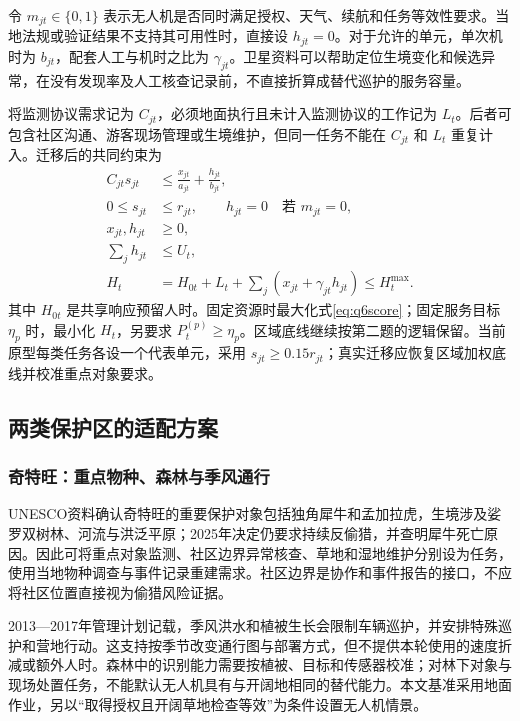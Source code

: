 \documentclass[UTF8,fontset=fandol,12pt,a4paper]{ctexart}
\begin{document}
令 \(m_{jt}\in\{0,1\}\) 表示无人机是否同时满足授权、天气、续航和任务等效性要求。当地法规或验证结果不支持其可用性时，直接设 \(h_{jt}=0\)。对于允许的单元，单次机时为 \(b_{jt}\)，配套人工与机时之比为 \(\gamma_{jt}\)。卫星资料可以帮助定位生境变化和候选异常，在没有发现率及人工核查记录前，不直接折算成替代巡护的服务容量。

将监测协议需求记为 \(C_{jt}\)，必须地面执行且未计入监测协议的工作记为 \(L_t\)。后者可包含社区沟通、游客现场管理或生境维护，但同一任务不能在 \(C_{jt}\) 和 \(L_t\) 重复计入。迁移后的共同约束为
\begin{equation}
\begin{aligned}
C_{jt}s_{jt}&\le \frac{x_{jt}}{a_{jt}}+\frac{h_{jt}}{b_{jt}},\\
0\le s_{jt}&\le r_{jt},\qquad h_{jt}=0\quad\text{若 }m_{jt}=0,\\
x_{jt},h_{jt}&\ge0,\\
\sum_jh_{jt}&\le U_t,\\
H_t&=H_{0t}+L_t+\sum_j\left(x_{jt}+\gamma_{jt}h_{jt}\right)\le H_t^{\max}.
\end{aligned}
\label{eq:q6constraints}
\end{equation}
其中 \(H_{0t}\) 是共享响应预留人时。固定资源时最大化式\eqref{eq:q6score}；固定服务目标 \(\eta_p\) 时，最小化 \(H_t\)，另要求 \(P_t^{(p)}\ge\eta_p\)。区域底线继续按第二题的逻辑保留。当前原型每类任务各设一个代表单元，采用 \(s_{jt}\ge0.15r_{jt}\)；真实迁移应恢复区域加权底线并校准重点对象要求。

\subsection{两类保护区的适配方案}

\subsubsection{奇特旺：重点物种、森林与季风通行}

UNESCO资料确认奇特旺的重要保护对象包括独角犀牛和孟加拉虎，生境涉及娑罗双树林、河流与洪泛平原；2025年决定仍要求持续反偷猎，并查明犀牛死亡原因\cite{chitwan,decision}。因此可将重点对象监测、社区边界异常核查、草地和湿地维护分别设为任务，使用当地物种调查与事件记录重建需求。社区边界是协作和事件报告的接口，不应将社区位置直接视为偷猎风险证据。

2013—2017年管理计划记载，季风洪水和植被生长会限制车辆巡护，并安排特殊巡护和营地行动\cite{cnpplan}。这支持按季节改变通行图与部署方式，但不提供本轮使用的速度折减或额外人时。森林中的识别能力需要按植被、目标和传感器校准；对林下对象与现场处置任务，不能默认无人机具有与开阔地相同的替代能力。本文基准采用地面作业，另以“取得授权且开阔草地检查等效”为条件设置无人机情景。
\end{document}
